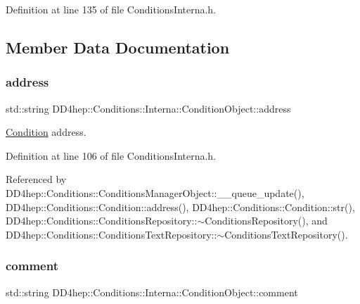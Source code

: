 Definition at line 135 of file Conditions\+Interna.\+h.



\subsection{Member Data Documentation}
\hypertarget{class_d_d4hep_1_1_conditions_1_1_interna_1_1_condition_object_ac30708fd16161d507f475cc81419be18}{}\label{class_d_d4hep_1_1_conditions_1_1_interna_1_1_condition_object_ac30708fd16161d507f475cc81419be18} 
\subsubsection{\texorpdfstring{address}{address}}
{\footnotesize\ttfamily std\+::string D\+D4hep\+::\+Conditions\+::\+Interna\+::\+Condition\+Object\+::address}



\hyperlink{class_d_d4hep_1_1_conditions_1_1_condition}{Condition} address. 



Definition at line 106 of file Conditions\+Interna.\+h.



Referenced by D\+D4hep\+::\+Conditions\+::\+Conditions\+Manager\+Object\+::\+\_\+\+\_\+queue\+\_\+update(), D\+D4hep\+::\+Conditions\+::\+Condition\+::address(), D\+D4hep\+::\+Conditions\+::\+Condition\+::str(), D\+D4hep\+::\+Conditions\+::\+Conditions\+Repository\+::$\sim$\+Conditions\+Repository(), and D\+D4hep\+::\+Conditions\+::\+Conditions\+Text\+Repository\+::$\sim$\+Conditions\+Text\+Repository().

\hypertarget{class_d_d4hep_1_1_conditions_1_1_interna_1_1_condition_object_a4bd162e79c142737fd279493329bae42}{}\label{class_d_d4hep_1_1_conditions_1_1_interna_1_1_condition_object_a4bd162e79c142737fd279493329bae42} 
\subsubsection{\texorpdfstring{comment}{comment}}
{\footnotesize\ttfamily std\+::string D\+D4hep\+::\+Conditions\+::\+Interna\+::\+Condition\+Object\+::comment}



